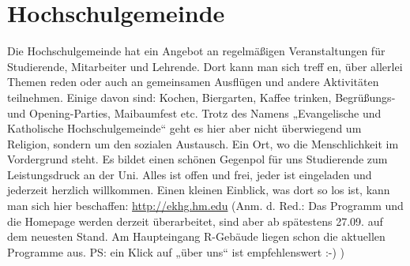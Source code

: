 \section{Hochschulgemeinde}
Die Hochschulgemeinde hat ein Angebot an regelmäßigen 
Veranstaltungen für Studierende, Mitarbeiter und Lehrende. Dort kann 
man sich treff en, über allerlei Themen reden oder auch an gemeinsamen 
Ausflügen und andere Aktivitäten teilnehmen. Einige davon sind: 
Kochen, Biergarten, Kaffee trinken, Begrüßungs- und Opening-Parties, 
Maibaumfest etc. 
Trotz des Namens „Evangelische und Katholische Hochschulgemeinde“ 
geht es hier aber nicht überwiegend um Religion, sondern um den 
sozialen Austausch. Ein Ort, wo die Menschlichkeit im Vordergrund 
steht. Es bildet einen schönen Gegenpol für uns Studierende zum 
Leistungsdruck an der Uni. 
Alles ist offen und frei, jeder ist eingeladen und jederzeit herzlich 
willkommen. 
Einen kleinen Einblick, was dort so los ist, kann man sich hier beschaffen: 
\url{http://ekhg.hm.edu} 
(Anm. d. Red.: Das Programm und die Homepage werden derzeit 
überarbeitet, sind aber ab spätestens 27.09. auf dem neuesten Stand. 
Am Haupteingang R-Gebäude liegen schon die aktuellen Programme 
aus. PS: ein Klick auf „über uns“ ist empfehlenswert :-) ) 